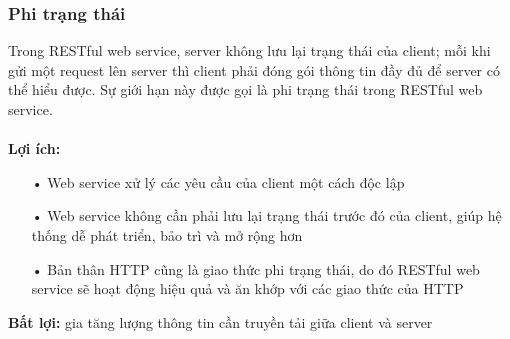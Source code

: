 \documentclass[a4paper]{article}
\begin{document}
\subsubsection{Phi trạng thái}
Trong RESTful web service, server không lưu lại trạng thái của client; mỗi khi gửi một request lên server thì client phải đóng gói thông tin đầy đủ để server có thể hiểu được. Sự giới hạn này được gọi là phi trạng thái trong RESTful web service.\\
\\
\textbf{Lợi ích:}
\begin{itemize}
	\item[•]Web service xử lý các yêu cầu của client một cách độc lập
	\item[•]Web service không cần phải lưu lại trạng thái trước đó của client, giúp hệ thống dễ phát triển, bảo trì và mở rộng hơn
	\item[•]Bản thân HTTP cũng là giao thức phi trạng thái, do đó RESTful web service sẽ hoạt động hiệu quả và ăn khớp với các giao thức của HTTP
\end{itemize}
\textbf{Bất lợi: }gia tăng lượng thông tin cần truyền tải giữa client và server
\end{document}

